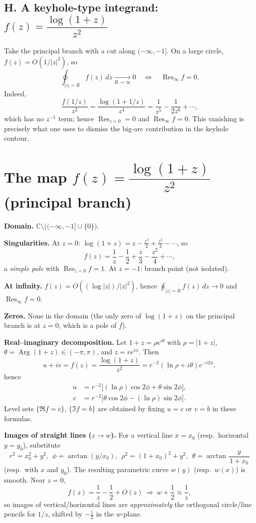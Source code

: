 \documentclass[12pt,a4paper]{article}
\DeclareMathOperator{\Arg}{Arg}
\DeclareMathOperator{\Res}{Res}
\newcommand{\C}{\mathbb{C}}
\begin{document}
	\subsection*{H. A keyhole-type integrand: $f(z)=\dfrac{\log(1+z)}{z^{2}}$}
	Take the principal branch with a cut along $(-\infty,-1]$.
	On a large circle, $f(z)=O(1/|z|^{2})$, so
	\[
	\oint_{|z|=R} f(z)\,dz \xrightarrow[R\to\infty]{} 0
	\quad\Longleftrightarrow\quad
	\Res_{\infty} f=0.
	\]
	Indeed,
	\[
	\frac{f(1/z)}{z^{2}}=\frac{\log(1+1/z)}{z^{4}}
	= \frac{1}{z^{5}} - \frac{1}{2z^{6}} + \cdots,
	\]
	which has no $z^{-1}$ term; hence $\Res_{z=0}=0$ and $\Res_{\infty} f=0$.
	This vanishing is precisely what one uses to dismiss the big-arc contribution in the keyhole contour.
	
	
	\section*{The map \(f(z)=\dfrac{\log(1+z)}{z^{2}}\) (principal branch)}
	
	\textbf{Domain.} \(\displaystyle \C\setminus\big((-\infty,-1]\cup\{0\}\big)\).
	
	\textbf{Singularities.}
	At \(z=0\): \(\log(1+z)=z-\tfrac{z^{2}}{2}+\tfrac{z^{3}}{3}-\cdots\),
	so
	\[
	f(z)=\frac{1}{z}-\frac{1}{2}+\frac{z}{3}-\frac{z^{2}}{4}+\cdots,
	\]
	a \emph{simple pole} with \(\boxed{\Res_{z=0} f=1}\).
	At \(z=-1\): branch point (not isolated).
	
	\textbf{At infinity.}
	\(f(z)=O((\log|z|)/|z|^{2})\), hence \(\displaystyle \oint_{|z|=R} f(z)\,dz\to 0\) and \(\Res_{\infty} f=0\).
	
	\textbf{Zeros.} None in the domain (the only zero of \(\log(1+z)\) on the principal branch is at \(z=0\), which is a pole of \(f\)).
	
	\medskip
	\textbf{Real--imaginary decomposition.}
	Let \(1+z=\rho e^{i\theta}\) with \(\rho=|1+z|\), \(\theta=\Arg(1+z)\in(-\pi,\pi)\),
	and \(z=re^{i\phi}\).
	Then
	\[
	u+iv=f(z)=\frac{\log(1+z)}{z^{2}}=r^{-2}(\ln\rho+i\theta)e^{-i2\phi},
	\]
	hence
	\[
	\boxed{
		\begin{aligned}
			u &= r^{-2}\bigl[(\ln\rho)\cos 2\phi+\theta\sin 2\phi\bigr],\\
			v &= r^{-2}\bigl[\theta\cos 2\phi-(\ln\rho)\sin 2\phi\bigr].
	\end{aligned}}
	\]
	Level sets \(\{\Re f=c\}\), \(\{\Im f=b\}\) are obtained by fixing \(u=c\) or \(v=b\) in these formulas.
	
	\medskip
	\textbf{Images of straight lines (\(z\to w\)).}
	For a vertical line \(x=x_{0}\) (resp.\ horizontal \(y=y_{0}\)), substitute
	\[
	r^{2}=x_{0}^{2}+y^{2},\ \ \phi=\arctan(y/x_{0}),\ \ \rho^{2}=(1+x_{0})^{2}+y^{2},\ \ \theta=\arctan\!\frac{y}{\,1+x_{0}\,}
	\]
	(resp.\ with \(x\) and \(y_{0}\)).
	The resulting parametric curve \(w(y)\) (resp.\ \(w(x)\)) is smooth.
	Near \(z=0\),
	\[
	f(z)=\frac{1}{z}-\frac12+O(z)\ \Longrightarrow\ w+\frac12\approx \frac{1}{z},
	\]
	so images of vertical/horizontal lines are \emph{approximately} the orthogonal
	circle/line pencils for \(1/z\), shifted by \(-\frac12\) in the \(w\)-plane.
	
\end{document}
